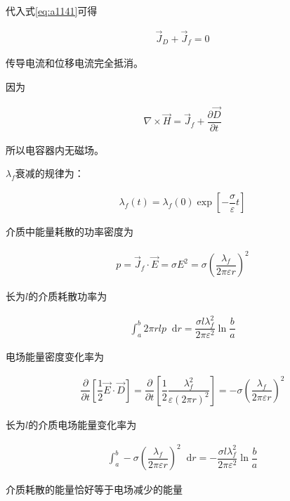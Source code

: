 \documentclass{article}
\newcommand*{\md}{\mathop{}\!\mathrm{d}}
\newcommand*{\Jmath}{J}
\begin{document}
代入式\ref{eq:a1141}可得

\begin{equation*}
  \begin{aligned}
    \vec{\Jmath}_D + \vec{\Jmath}_f = 0
  \end{aligned}
\end{equation*}

传导电流和位移电流完全抵消。

因为

\begin{equation*}
  \begin{aligned}
    \nabla \times \vec{H} = \vec{\Jmath}_f + \dfrac{\partial \vec{D}}{\partial t} 
  \end{aligned}
\end{equation*}

所以电容器内无磁场。

$\lambda_f$衰减的规律为：

\begin{equation*}
  \begin{aligned}
    \lambda_f \left( t \right) = \lambda_f \left( 0 \right) \exp \left[ - \dfrac{\sigma}{\varepsilon} t  \right]
  \end{aligned}
\end{equation*}

介质中能量耗散的功率密度为

\begin{equation*}
  \begin{aligned}
    p = \vec{\Jmath}_f \cdot \vec{E} = \sigma E^2 = \sigma \left( \dfrac{\lambda_f}{2 \pi \varepsilon r}  \right)^2
  \end{aligned}
\end{equation*}

长为$l$的介质耗散功率为

\begin{equation*}
  \begin{aligned}
    \int_a^b 2 \pi r l p \md r = \dfrac{\sigma l \lambda_f^2}{2 \pi \varepsilon^2} \ln \dfrac{b}{a}  
  \end{aligned}
\end{equation*}

电场能量密度变化率为

\begin{equation*}
  \begin{aligned}
    \dfrac{\partial}{\partial t } \left[ \dfrac{1}{2} \vec{E} \cdot \vec{D}  \right] = \dfrac{\partial}{\partial t} \left[ \dfrac{1}{2} \dfrac{\lambda_f^2}{\varepsilon \left( 2 \pi r \right)^2}   \right]  = - \sigma \left( \dfrac{\lambda_f}{2 \pi \varepsilon r}  \right)^2
  \end{aligned}
\end{equation*}

长为$l$的介质电场能量变化率为

\begin{equation*}
  \begin{aligned}
    \int_a^b - \sigma \left( \dfrac{\lambda_f}{2 \pi \varepsilon r}  \right)^2 \md r = - \dfrac{\sigma l \lambda_f^2}{2 \pi \varepsilon^2} \ln \dfrac{b}{a}  
  \end{aligned}
\end{equation*}

介质耗散的能量恰好等于电场减少的能量
\end{document}
